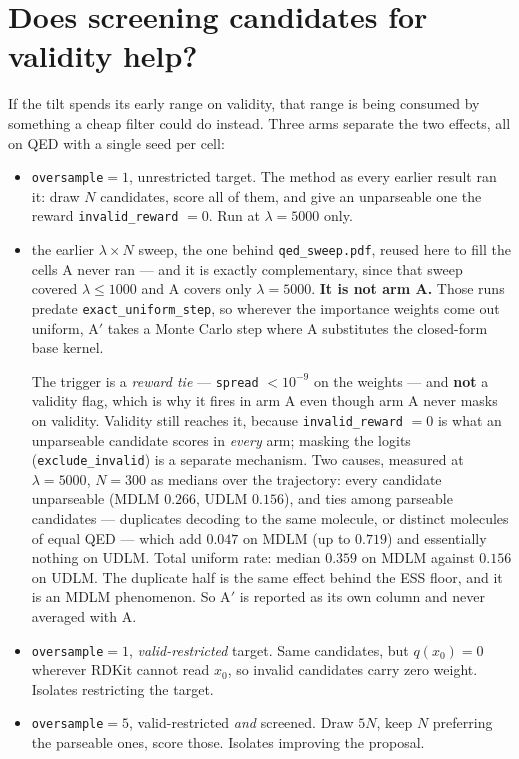 \documentclass[11pt]{article}
\begin{document}
\section{Does screening candidates for validity help?}

If the tilt spends its early range on validity, that range is being consumed by
something a cheap filter could do instead. Three arms separate the two effects,
all on QED with a single seed per cell:

\begin{itemize}
  \item[\textbf{A}] \texttt{oversample}$=1$, unrestricted target. The method as
        every earlier result ran it: draw $N$ candidates, score all of them, and
        give an unparseable one the reward \texttt{invalid\_reward} $=0$.
        Run at $\lambda = 5000$ only.
  \item[\textbf{A$'$}] the earlier $\lambda \times N$ sweep, the one behind
        \texttt{qed\_sweep.pdf}, reused here to fill the cells A never ran --- and
        it is exactly complementary, since that sweep covered
        $\lambda \leq 1000$ and A covers only $\lambda = 5000$.
        \textbf{It is not arm A.} Those runs predate
        \texttt{exact\_uniform\_step}, so wherever the importance weights come
        out uniform, A$'$ takes a Monte Carlo step where A substitutes the
        closed-form base kernel.

        The trigger is a \emph{reward tie} --- \texttt{spread} $< 10^{-9}$ on the
        weights --- and \textbf{not} a validity flag, which is why it fires in
        arm A even though arm A never masks on validity. Validity still reaches
        it, because \texttt{invalid\_reward} $=0$ is what an unparseable
        candidate scores in \emph{every} arm; masking the logits
        (\texttt{exclude\_invalid}) is a separate mechanism. Two causes,
        measured at $\lambda = 5000$, $N = 300$ as medians over the trajectory:
        every candidate unparseable (MDLM $0.266$, UDLM $0.156$), and ties among
        parseable candidates --- duplicates decoding to the same molecule, or
        distinct molecules of equal QED --- which add $0.047$ on MDLM (up to
        $0.719$) and essentially nothing on UDLM. Total uniform rate: median
        $0.359$ on MDLM against $0.156$ on UDLM. The duplicate half is the same
        effect behind the ESS floor, and it is an MDLM phenomenon. So A$'$ is
        reported as its own column and never averaged with A.
  \item[\textbf{B}] \texttt{oversample}$=1$, \emph{valid-restricted} target.
        Same candidates, but $q(x_0) = 0$ wherever RDKit cannot read $x_0$, so
        invalid candidates carry zero weight. Isolates restricting the target.
  \item[\textbf{C}] \texttt{oversample}$=5$, valid-restricted \emph{and}
        screened. Draw $5N$, keep $N$ preferring the parseable ones, score those.
        Isolates improving the proposal.
\end{itemize}
\end{document}
